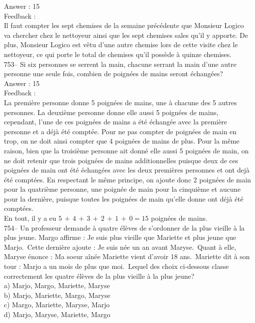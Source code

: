 \documentclass[letterpaper, 12pt]{article}
\begin{document}
Answer : 15\\

Feedback : \\
Il faut compter les sept chemises de la semaine pr\'ec\'edente que Monsieur
Logico va chercher chez le nettoyeur ainsi que les sept chemises sales qu'il
y apporte. De plus, Monsieur Logico est v\^etu d'une autre chemise lors de
cette visite chez le nettoyeur, ce qui porte le total de chemises qu'il
poss\`ede \`a quinze chemises.\\

753-- Si six personnes se serrent la main, chacune serrant la main d'une
autre personne une seule fois, combien de poign\'ees de mains seront
\'echang\'ees?\\

Answer : 15\\

Feedback : \\
La premi\`ere personne donne 5 poign\'ees de mains, une \`a chacune
des 5 autres personnes. La deuxi\`eme personne donne elle aussi 5
poign\'ees de mains, cependant, l'une de ces poign\'ees de mains a
\'et\'e \'echang\'ee avec la premi\`ere personne et a d\'ej\`a
\'et\'e compt\'ee. Pour ne pas compter de poign\'ees de main en
trop, on ne doit ainsi compter que 4 poign\'ees de mains de plus.
Pour la m\^eme raison, bien que la troisi\`eme personne ait donn\'e
elle aussi 5 poign\'ees de main, on ne doit retenir que trois
poign\'ees de mains additionnelles puisque deux de ces poign\'ees de
main ont \'et\'e \'echang\'ees avec les deux premi\`eres personnes
et ont dej\`a \'et\'e compt\'ees. En respectant le m\^eme principe,
on ajoute donc 2 poign\'ees de main pour la quatri\`eme personne,
une poign\'ee de main pour la cinqui\`eme et aucune pour la
derni\`ere, puisque toutes les poign\'ees de main qu'elle donne ont
d\'ej\`a
\'et\'e compt\'ees.\\
En tout, il y a eu $5\,+\,4\,+\,3\,+\,2\,+\,1\,+\,0=15$ poign\'ees de
mains.\\

754-- Un professeur demande \`a quatre \'el\`eves de s'ordonner de
la plus vieille \`a la plus jeune.  Margo affirme : \og Je suis plus
vieille que Mariette et plus jeune que Marjo.\fg\  Cette derni\`ere
ajoute : \og Je suis n\'ee un an avant Maryse.\fg\  Quant \`a elle,
Maryse \'enonce : \og Ma soeur a\^in\'ee Mariette vient d'avoir 18
ans.\fg\ Mariette dit \`a son tour : \og Marjo a un mois de plus que
moi.\fg\ Lequel des choix ci-dessous classe correctement les
quatre \'el\`eves de la plus vieille \`a la plus jeune?\\
a) Marjo, Margo, Mariette, Maryse\\
b) Marjo, Mariette, Margo, Maryse\\
c) Margo, Mariette, Maryse, Marjo\\
d) Marjo, Maryse, Mariette, Margo\\
\end{document}
